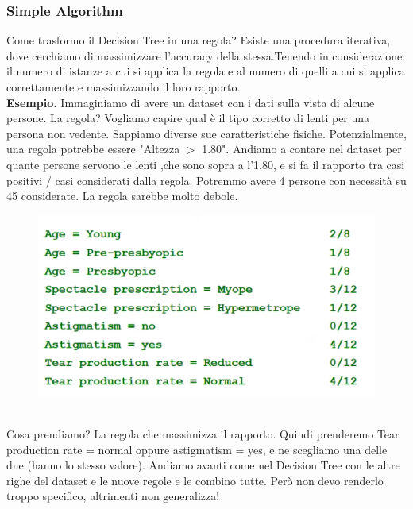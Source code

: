 \subsubsection{Simple Algorithm}
Come trasformo il Decision Tree in una regola? Esiste una procedura iterativa, dove cerchiamo di massimizzare l'accuracy della stessa.Tenendo in considerazione il numero di istanze a cui si applica la regola e al numero di quelli a cui si applica correttamente e massimizzando il loro rapporto.
\\
\textbf{Esempio.} Immaginiamo di avere un dataset con i dati sulla vista di alcune persone. La regola? Vogliamo capire qual è il tipo corretto di lenti per una persona non vedente. Sappiamo diverse sue caratteristiche fisiche. Potenzialmente, una regola potrebbe essere "Altezza $>$ 1.80". Andiamo a contare nel dataset per quante persone servono le lenti ,che sono sopra a l'1.80, e si fa il rapporto tra casi positivi / casi considerati dalla regola. Potremmo avere 4 persone con necessità su 45 considerate. La regola sarebbe molto debole. 
\\
\begin{figure}[th]
    \centering
    \includegraphics[scale=0.35]{ML/img/dataset_lenses.png}
\end{figure}
\\
Cosa prendiamo? La regola che massimizza il rapporto. Quindi prenderemo Tear production rate = normal oppure astigmatism = yes, e ne scegliamo una delle due (hanno lo stesso valore). Andiamo avanti come nel Decision Tree con le altre righe del dataset e le nuove regole e le combino tutte. Però non devo renderlo troppo specifico, altrimenti non generalizza!

